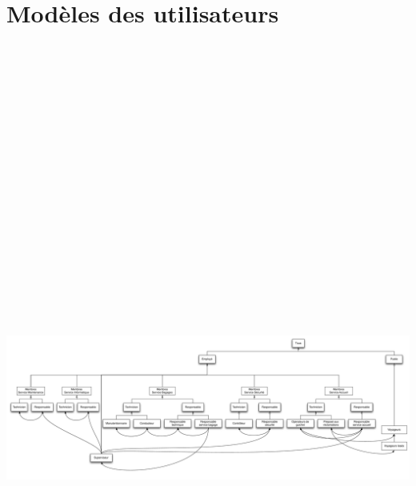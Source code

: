 \part{Modèles des utilisateurs}
\begin{center}
    \includegraphics[angle=90, height=24cm]{../../MU/src/img/MU.pdf}
\end{center}
\newpage
